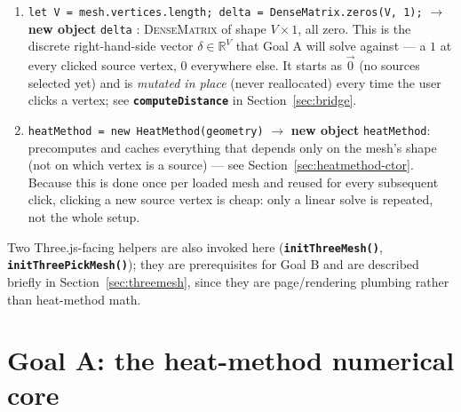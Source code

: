 \documentclass[11pt]{article}
\newcommand{\code}[1]{\texttt{#1}}
\newcommand{\func}[1]{\texttt{\textbf{#1}}}
\newcommand{\type}[1]{\textsc{#1}}
\newcommand{\R}{\mathbb{R}}
\begin{document}
\begin{enumerate}[leftmargin=1.6em]
\item \code{let V = mesh.vertices.length; delta = DenseMatrix.zeros(V, 1);} $\to$
  \textbf{new object} \code{delta} : \type{DenseMatrix} of shape $V\times 1$, all zero.
  This is the discrete right-hand-side vector $\delta \in \R^{V}$ that Goal A will solve
  against --- a $1$ at every clicked source vertex, $0$ everywhere else. It starts as
  $\vec 0$ (no sources selected yet) and is \emph{mutated in place} (never reallocated)
  every time the user clicks a vertex; see \func{computeDistance} in
  Section~\ref{sec:bridge}.

\item \code{heatMethod = new HeatMethod(geometry)} $\to$ \textbf{new object}
  \code{heatMethod}: precomputes and caches everything that depends only on the mesh's
  shape (not on which vertex is a source) --- see Section~\ref{sec:heatmethod-ctor}. Because
  this is done once per loaded mesh and reused for every subsequent click, clicking a new
  source vertex is cheap: only a linear solve is repeated, not the whole setup.

\end{enumerate}

Two Three.js-facing helpers are also invoked here (\func{initThreeMesh()},
\func{initThreePickMesh()}); they are prerequisites for Goal B and are described briefly in
Section~\ref{sec:threemesh}, since they are page/rendering plumbing rather than heat-method
math.

\section{Goal A: the heat-method numerical core}
\label{sec:goalA}
\end{document}
